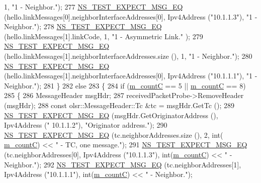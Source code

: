 \begin{DoxyCode}
       1, \textcolor{stringliteral}{"1 - Neighbor."});
277       \hyperlink{group__testing_ga7304ba46a28d8cf08dfdfd6499cf7068}{NS\_TEST\_EXPECT\_MSG\_EQ} (hello.linkMessages[0].neighborInterfaceAddresses[0], 
      Ipv4Address (\textcolor{stringliteral}{"10.1.1.3"}), \textcolor{stringliteral}{"1 - Neighbor."});
278       \hyperlink{group__testing_ga7304ba46a28d8cf08dfdfd6499cf7068}{NS\_TEST\_EXPECT\_MSG\_EQ} (hello.linkMessages[1].linkCode, 1, \textcolor{stringliteral}{"1 - Asymmetric Link."}
      );
279       \hyperlink{group__testing_ga7304ba46a28d8cf08dfdfd6499cf7068}{NS\_TEST\_EXPECT\_MSG\_EQ} (hello.linkMessages[1].neighborInterfaceAddresses.size (),
       1, \textcolor{stringliteral}{"1 - Neighbor."});
280       \hyperlink{group__testing_ga7304ba46a28d8cf08dfdfd6499cf7068}{NS\_TEST\_EXPECT\_MSG\_EQ} (hello.linkMessages[1].neighborInterfaceAddresses[0], 
      Ipv4Address (\textcolor{stringliteral}{"10.1.1.1"}), \textcolor{stringliteral}{"1 - Neighbor."});
281     \}
282   \textcolor{keywordflow}{else}
283     \{
284       \textcolor{keywordflow}{if} (\hyperlink{classns3_1_1olsr_1_1TcRegressionTest_a7ff866c3417a672eb3bb43f08a399eaa}{m\_countC} == 5 || \hyperlink{classns3_1_1olsr_1_1TcRegressionTest_a7ff866c3417a672eb3bb43f08a399eaa}{m\_countC} == 8)
285         \{
286           MessageHeader msgHdr;
287           receivedPacketProbe->RemoveHeader (msgHdr);
288           \textcolor{keyword}{const} olsr::MessageHeader::Tc &tc = msgHdr.GetTc ();
289           \hyperlink{group__testing_ga7304ba46a28d8cf08dfdfd6499cf7068}{NS\_TEST\_EXPECT\_MSG\_EQ} (msgHdr.GetOriginatorAddress (), Ipv4Address (\textcolor{stringliteral}{"
      10.1.1.2"}), \textcolor{stringliteral}{"Originator address."});
290           \hyperlink{group__testing_ga7304ba46a28d8cf08dfdfd6499cf7068}{NS\_TEST\_EXPECT\_MSG\_EQ} (tc.neighborAddresses.size (), 2, int(
      \hyperlink{classns3_1_1olsr_1_1TcRegressionTest_a7ff866c3417a672eb3bb43f08a399eaa}{m\_countC}) << \textcolor{stringliteral}{" - TC, one message."});
291           \hyperlink{group__testing_ga7304ba46a28d8cf08dfdfd6499cf7068}{NS\_TEST\_EXPECT\_MSG\_EQ} (tc.neighborAddresses[0], Ipv4Address (\textcolor{stringliteral}{"10.1.1.3"}), \textcolor{keywordtype}{
      int}(\hyperlink{classns3_1_1olsr_1_1TcRegressionTest_a7ff866c3417a672eb3bb43f08a399eaa}{m\_countC}) << \textcolor{stringliteral}{" - Neighbor."});
292           \hyperlink{group__testing_ga7304ba46a28d8cf08dfdfd6499cf7068}{NS\_TEST\_EXPECT\_MSG\_EQ} (tc.neighborAddresses[1], Ipv4Address (\textcolor{stringliteral}{"10.1.1.1"}), \textcolor{keywordtype}{
      int}(\hyperlink{classns3_1_1olsr_1_1TcRegressionTest_a7ff866c3417a672eb3bb43f08a399eaa}{m\_countC}) << \textcolor{stringliteral}{" - Neighbor."});

\end{DoxyCode}
